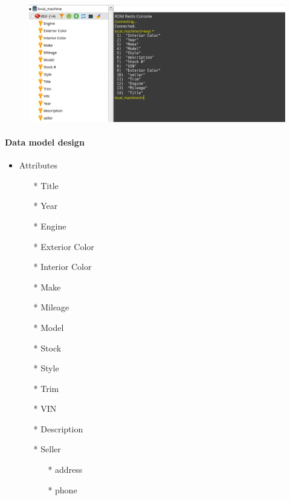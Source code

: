 \documentclass[11pt]{article}
\makeatletter
\def\maxwidth{\ifdim\Gin@nat@width>\linewidth\linewidth
    \else\Gin@nat@width\fi}
\let\Oldincludegraphics\includegraphics
\renewcommand{\includegraphics}[1]{\Oldincludegraphics[width=.8\maxwidth]{#1}}
\providecommand{\tightlist}{%
      \setlength{\itemsep}{0pt}\setlength{\parskip}{0pt}}
\makeatother
\begin{document}
\begin{figure}[H]
	\centering
	\includegraphics{2.png}
	\caption{}
\end{figure}

    \paragraph{Data model design}\label{data-model-design}

    \begin{itemize}
\tightlist
\item
  Attributes

  \begin{itemize}
  \tightlist
  \item[*]
    Title
  \item[*]
    Year
  \item[*]
    Engine
  \item[*]
    Exterior Color
  \item[*]
    Interior Color
  \item[*]
    Make
  \item[*]
    Mileage
  \item[*]
    Model
  \item[*]
    Stock
  \item[*]
    Style
  \item[*]
    Trim
  \item[*]
    VIN
  \item[*]
    Description
  \item[*]
    Seller

    \begin{itemize}
    \tightlist
    \item[*]
      address
    \item[*]
      phone
    \end{itemize}
  \end{itemize}
\end{itemize}
\end{document}
